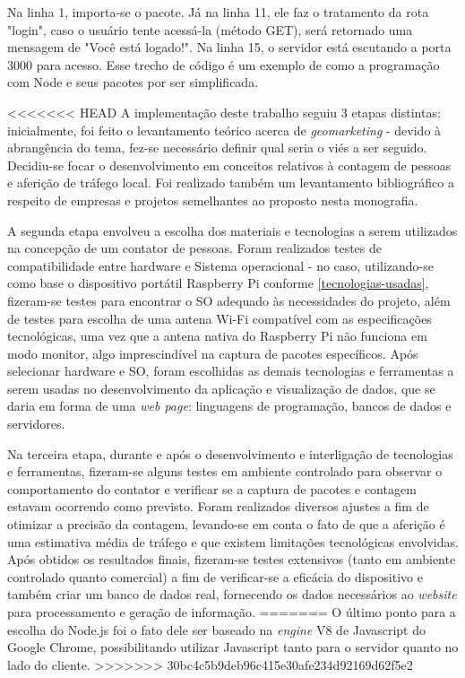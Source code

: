 Na linha 1, importa-se o pacote. Já na linha 11, ele faz o tratamento da rota "login", caso o usuário tente acessá-la (método GET), será retornado uma mensagem de "Você está logado!". Na linha 15, o servidor está escutando a porta 3000 para acesso. Esse trecho de código é um exemplo de como a programação
com Node e seus pacotes por ser simplificada.

<<<<<<< HEAD
A implementação deste trabalho seguiu 3 etapas distintas: inicialmente, foi feito o levantamento teórico acerca de \emph{geomarketing} - devido à abrangência do tema, fez-se necessário definir qual seria o viés a ser seguido. Decidiu-se focar o desenvolvimento em conceitos relativos à contagem de pessoas e aferição de tráfego local. Foi realizado também um levantamento bibliográfico a respeito de empresas e projetos semelhantes ao proposto nesta monografia. 

A segunda etapa envolveu a escolha dos materiais e tecnologias a serem utilizados na concepção de um contator de pessoas. Foram realizados testes de compatibilidade entre hardware e Sistema operacional - no caso, utilizando-se como base o dispositivo portátil Raspberry Pi conforme \autoref{tecnologias-usadas}, fizeram-se testes para encontrar o SO adequado às necessidades do projeto, além de testes para escolha de uma antena Wi-Fi compatível com as especificações tecnológicas, uma vez que a antena nativa do Raspberry Pi não funciona em modo monitor, algo imprescindível na captura de pacotes específicos. Após selecionar hardware e SO, foram escolhidas as demais tecnologias e ferramentas a serem usadas no desenvolvimento da aplicação e visualização de dados, que se daria em forma de uma \emph{web page}: linguagens de programação, bancos de dados e servidores.

Na terceira etapa, durante e após o desenvolvimento e interligação de tecnologias e ferramentas, fizeram-se alguns testes em ambiente controlado para observar o comportamento do  contator e verificar se a captura de pacotes e contagem estavam ocorrendo como previsto. Foram realizados diversos ajustes a fim de otimizar a precisão da contagem, levando-se em conta o fato de que a aferição é uma estimativa média de tráfego e que existem limitações tecnológicas envolvidas. Após obtidos os resultados finais, fizeram-se testes extensivos (tanto em ambiente controlado quanto comercial) a fim de verificar-se a eficácia do dispositivo e também criar um banco de dados real, fornecendo os dados necessários ao \emph{website} para processamento e geração de informação.
=======
O último ponto para a escolha do Node.js foi o fato dele ser baseado na \emph{engine} V8 de Javascript do Google
Chrome, possibilitando utilizar Javascript tanto para o servidor quanto no lado do cliente.
>>>>>>> 30bc4c5b9deb96c415e30afe234d92169d62f5e2

